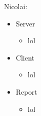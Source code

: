 Nicolai: 
\begin{itemize}
	\item Server
	\begin{itemize}
		\item lol
	\end{itemize}
	\item Client
	\begin{itemize}
		\item lol
	\end{itemize}
	\item Report
	\begin{itemize}
		\item lol
	\end{itemize}
\end{itemize}
\newpage